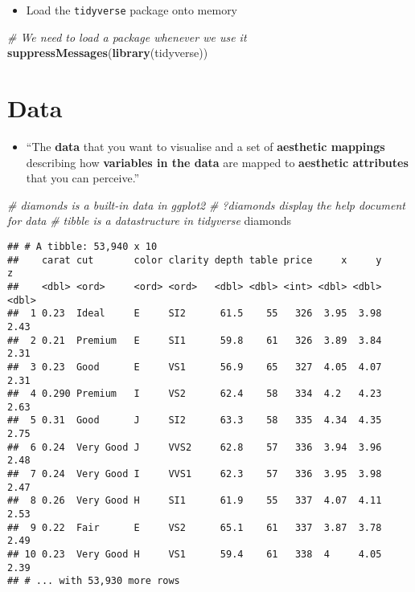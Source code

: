\documentclass[]{book}
\newenvironment{Shaded}{\begin{snugshade}}{\end{snugshade}}
\newcommand{\KeywordTok}[1]{\textcolor[rgb]{0.13,0.29,0.53}{\textbf{{#1}}}}
\newcommand{\CommentTok}[1]{\textcolor[rgb]{0.56,0.35,0.01}{\textit{{#1}}}}
\newcommand{\NormalTok}[1]{{#1}}
\providecommand{\tightlist}{%
  \setlength{\itemsep}{0pt}\setlength{\parskip}{0pt}}
\begin{document}
\begin{itemize}
\tightlist
\item
  Load the \texttt{tidyverse} package onto memory
\end{itemize}

\begin{Shaded}
\begin{Highlighting}[]
\CommentTok{# We need to load a package whenever we use it}
\KeywordTok{suppressMessages}\NormalTok{(}\KeywordTok{library}\NormalTok{(tidyverse)) }
\end{Highlighting}
\end{Shaded}

\section{Data}\label{data}

\begin{itemize}
\tightlist
\item
  ``The \textbf{data} that you want to visualise and a set of
  \textbf{aesthetic mappings} describing how \textbf{variables in the
  data} are mapped to \textbf{aesthetic attributes} that you can
  perceive.'' \citep{ggplot2}
\end{itemize}

\begin{Shaded}
\begin{Highlighting}[]
\CommentTok{# diamonds is a built-in data in ggplot2}
\CommentTok{# ?diamonds display the help document for data }
\CommentTok{# tibble is a datastructure in tidyverse }
\NormalTok{diamonds}
\end{Highlighting}
\end{Shaded}

\begin{verbatim}
## # A tibble: 53,940 x 10
##    carat cut       color clarity depth table price     x     y     z
##    <dbl> <ord>     <ord> <ord>   <dbl> <dbl> <int> <dbl> <dbl> <dbl>
##  1 0.23  Ideal     E     SI2      61.5    55   326  3.95  3.98  2.43
##  2 0.21  Premium   E     SI1      59.8    61   326  3.89  3.84  2.31
##  3 0.23  Good      E     VS1      56.9    65   327  4.05  4.07  2.31
##  4 0.290 Premium   I     VS2      62.4    58   334  4.2   4.23  2.63
##  5 0.31  Good      J     SI2      63.3    58   335  4.34  4.35  2.75
##  6 0.24  Very Good J     VVS2     62.8    57   336  3.94  3.96  2.48
##  7 0.24  Very Good I     VVS1     62.3    57   336  3.95  3.98  2.47
##  8 0.26  Very Good H     SI1      61.9    55   337  4.07  4.11  2.53
##  9 0.22  Fair      E     VS2      65.1    61   337  3.87  3.78  2.49
## 10 0.23  Very Good H     VS1      59.4    61   338  4     4.05  2.39
## # ... with 53,930 more rows
\end{verbatim}
\end{document}
